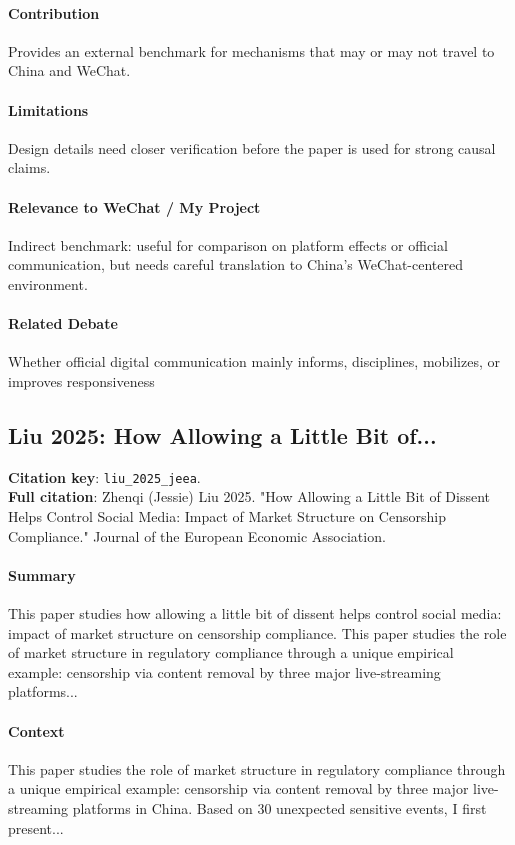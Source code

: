 \documentclass[12pt]{article}
\begin{document}
\paragraph{Contribution} Provides an external benchmark for mechanisms that may or may not travel to China and WeChat.

\paragraph{Limitations} Design details need closer verification before the paper is used for strong causal claims.

\paragraph{Relevance to WeChat / My Project} Indirect benchmark: useful for comparison on platform effects or official communication, but needs careful translation to China's WeChat-centered environment.

\paragraph{Related Debate} Whether official digital communication mainly informs, disciplines, mobilizes, or improves responsiveness


\subsection{Liu 2025: How Allowing a Little Bit of...}
\textbf{Citation key}: \texttt{liu\_2025\_jeea}.\\
\textbf{Full citation}: Zhenqi (Jessie) Liu 2025. "How Allowing a Little Bit of Dissent Helps Control Social Media: Impact of Market Structure on Censorship Compliance." Journal of the European Economic Association.

\paragraph{Summary} This paper studies how allowing a little bit of dissent helps control social media: impact of market structure on censorship compliance. This paper studies the role of market structure in regulatory compliance through a unique empirical example: censorship via content removal by three major live-streaming platforms...

\paragraph{Context} This paper studies the role of market structure in regulatory compliance through a unique empirical example: censorship via content removal by three major live-streaming platforms in China. Based on 30 unexpected sensitive events, I first present...
\end{document}
